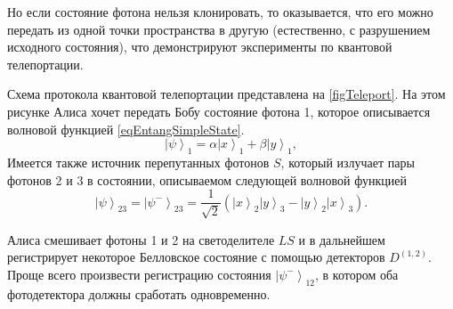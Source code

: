 Но если состояние фотона нельзя клонировать, то оказывается, что его
можно передать из одной точки пространства в другую  
(естественно, с разрушением исходного состояния), что
демонстрируют эксперименты по квантовой телепортации. 



Схема протокола квантовой телепортации представлена на 
\autoref{figTeleport}. На этом рисунке Алиса хочет передать Бобу  
состояние фотона 1, которое описывается волновой функцией
\eqref{eqEntangSimpleState}. 
\[
\left|\psi\right>_1 = \alpha \left|x\right>_1 +
\beta \left|y\right>_1, 
\]
Имеется также источник перепутанных фотонов $S$, который излучает пары
фотонов 2 и 3 в состоянии, описываемом следующей волновой функцией 
\begin{equation}
  \left|\psi\right>_{23} = \left|\psi^{-}\right>_{23} = \frac{1}{\sqrt{2}}\left(
  \left|x\right>_2\left|y\right>_3 - 
  \left|y\right>_2\left|x\right>_3
  \right).
  \nonumber
\end{equation}

Алиса смешивает фотоны 1 и 2 на светоделителе $LS$ и в дальнейшем
регистрирует некоторое Белловское состояние с помощью детекторов
$D^{(1,2)}$. Проще всего произвести регистрацию состояния
$\left|\psi^{-}\right>_{12}$, в котором оба фотодетектора должны
сработать одновременно.

